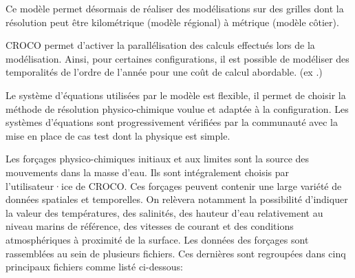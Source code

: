\documentclass[10pt,a4paper,titlepage]{article}
\begin{document}
Ce modèle permet désormais de réaliser des modélisations sur des grilles dont la résolution peut être kilométrique (modèle régional) à métrique (modèle côtier).

CROCO permet d'activer la parallélisation des calculs effectués lors de la modélisation. Ainsi, pour certaines configurations, il est possible de modéliser des temporalités de l'ordre de l'année pour une coût de calcul abordable. (ex .)

Le système d'équations utilisées par le modèle est flexible, il permet de choisir la méthode de résolution physico-chimique voulue et adaptée à la configuration.
Les systèmes d'équations sont progressivement vérifiées par la communauté avec la mise en place de cas test dont la physique est simple. %

Les forçages physico-chimiques initiaux et aux limites sont la source des mouvements dans la masse d'eau.
Ils sont intégralement choisis par l'utilisateur·ice de CROCO.
Ces forçages peuvent contenir une large variété de données spatiales et temporelles.
On relèvera notamment la possibilité d'indiquer la valeur des températures, des salinités, des hauteur d'eau relativement au niveau marins de référence, des vitesses de courant et des conditions atmosphériques à proximité de la surface.
Les données des forçages sont rassemblées au sein de plusieurs fichiers.
Ces dernières sont regroupées dans cinq principaux fichiers comme listé ci-dessous:
\end{document}

